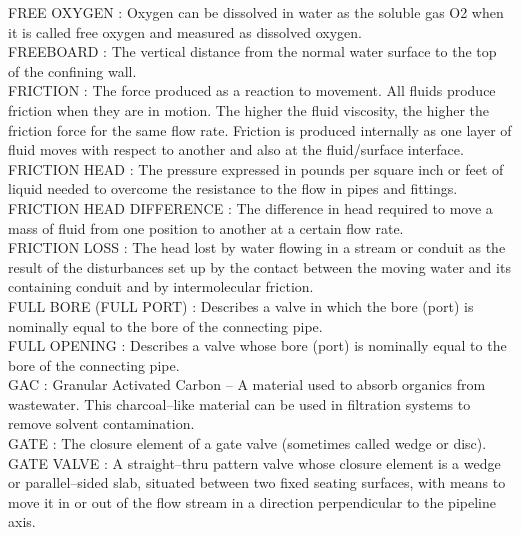 \vspace{0.15cm}
FREE OXYGEN :  Oxygen can be dissolved in water as the soluble gas O2 when it is called free oxygen and measured as dissolved oxygen.\\
\vspace{0.15cm}
FREEBOARD :  The vertical distance from the normal water surface to the top of the confining wall.\\
\vspace{0.15cm}
FRICTION :   The force produced as a reaction to movement. All fluids produce friction when they are in motion. The higher the fluid viscosity, the higher the friction force for the same flow rate. Friction is produced internally as one layer of fluid moves with respect to another and also at the fluid/surface interface.\\
\vspace{0.15cm}
FRICTION HEAD :   The pressure expressed in pounds per square inch or feet of liquid needed to overcome the resistance to the flow in pipes and fittings.\\
\vspace{0.15cm}
FRICTION HEAD DIFFERENCE :   The difference in head required to move a mass of fluid from one position to another at a certain flow rate.\\
\vspace{0.15cm}
FRICTION LOSS :  The head lost by water flowing in a stream or conduit as the result of the disturbances set up by the contact between the moving water and its containing conduit and by intermolecular friction. \\
\vspace{0.15cm}
FULL BORE (FULL PORT) :   Describes a valve in which the bore (port) is nominally equal to the bore of the connecting pipe.\\
\vspace{0.15cm}
FULL OPENING :   Describes a valve whose bore (port) is nominally equal to the bore of the connecting pipe.\\
\vspace{0.15cm}
GAC :  Granular Activated Carbon –  A material used to absorb organics from wastewater. This charcoal–like material can be used in filtration systems to remove solvent contamination.\\
\vspace{0.15cm}
GATE :   The closure element of a gate valve (sometimes called wedge or disc).\\
\vspace{0.15cm}
GATE VALVE :   A straight–thru pattern valve whose closure element is a wedge or parallel–sided slab, situated between two fixed seating surfaces, with means to move it in or out of the flow stream in a direction perpendicular to the pipeline axis.\\
